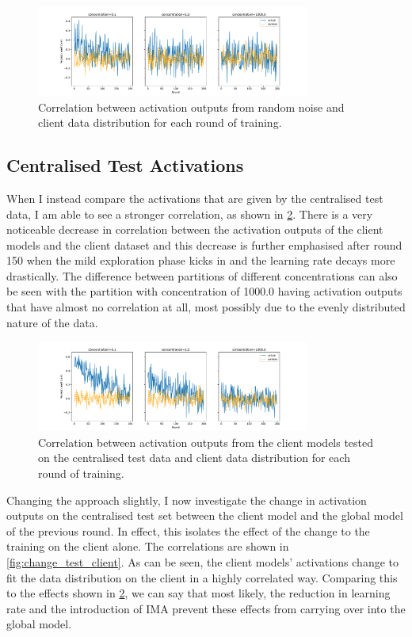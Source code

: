 \documentclass{article}
\begin{document}
\begin{figure}
  \centering
  \includegraphics[width=0.8\textwidth]{images/noise_client_pearson_vs_rounds.pdf}
  \caption{Correlation between activation outputs from random noise and client data distribution for each round of training.}
  \label{fig:noise_client}
\end{figure}

\subsection{Centralised Test Activations}
When I instead compare the activations that are given by the centralised test data, I am able to see a stronger correlation, as shown in \cref{fig:test_client}. There is a very noticeable decrease in correlation between the activation outputs of the client models and the client dataset and this decrease is further emphasised after round 150 when the mild exploration phase kicks in and the learning rate decays more drastically. The difference between partitions of different concentrations can also be seen with the partition with concentration of 1000.0 having activation outputs that have almost no correlation at all, most possibly due to the evenly distributed nature of the data.

\begin{figure}
  \centering
  \includegraphics[width=0.8\textwidth]{images/client_pearson_vs_rounds.pdf}
  \caption{Correlation between activation outputs from the client models tested on the centralised test data and client data distribution for each round of training.}
  \label{fig:test_client}
\end{figure}

Changing the approach slightly, I now investigate the change in activation outputs on the centralised test set between the client model and the global model of the previous round. In effect, this isolates the effect of the change to the training on the client alone. The correlations are shown in \cref{fig:change_test_client}. As can be seen, the client models' activations change to fit the data distribution on the client in a highly correlated way. Comparing this to the effects shown in \cref{fig:test_client}, we can say that most likely, the reduction in learning rate and the introduction of IMA prevent these effects from carrying over into the global model.
\end{document}
